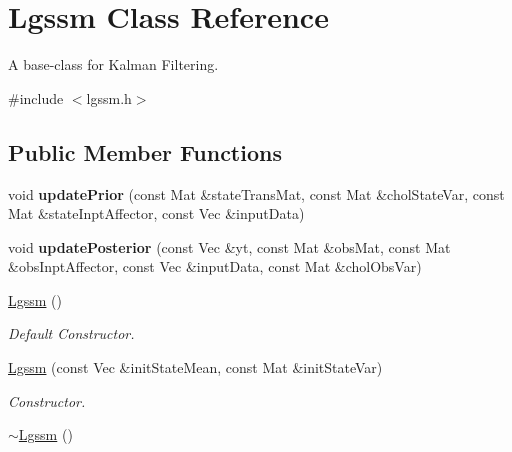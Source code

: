 \hypertarget{classLgssm}{}\section{Lgssm Class Reference}
\label{classLgssm}


A base-\/class for Kalman Filtering.  




{\ttfamily \#include $<$lgssm.\+h$>$}

\subsection*{Public Member Functions}
\begin{DoxyCompactItemize}
\item 
void {\bfseries update\+Prior} (const Mat \&state\+Trans\+Mat, const Mat \&chol\+State\+Var, const Mat \&state\+Inpt\+Affector, const Vec \&input\+Data)\hypertarget{classLgssm_ab6df7f45d20a18f1f6b330ae30507f4d}{}\label{classLgssm_ab6df7f45d20a18f1f6b330ae30507f4d}

\item 
void {\bfseries update\+Posterior} (const Vec \&yt, const Mat \&obs\+Mat, const Mat \&obs\+Inpt\+Affector, const Vec \&input\+Data, const Mat \&chol\+Obs\+Var)\hypertarget{classLgssm_a83bccb6907e9d672c6a7d634e9e569f2}{}\label{classLgssm_a83bccb6907e9d672c6a7d634e9e569f2}

\item 
\hyperlink{classLgssm_a8c729ab27738f29225847777b740877e}{Lgssm} ()\hypertarget{classLgssm_a8c729ab27738f29225847777b740877e}{}\label{classLgssm_a8c729ab27738f29225847777b740877e}

\begin{DoxyCompactList}\small\item\em Default Constructor. \end{DoxyCompactList}\item 
\hyperlink{classLgssm_a779def860490023f436b4efe071789fd}{Lgssm} (const Vec \&init\+State\+Mean, const Mat \&init\+State\+Var)
\begin{DoxyCompactList}\small\item\em Constructor. \end{DoxyCompactList}\item 
\hyperlink{classLgssm_afdb5db740e12453879d8b985180426a4}{$\sim$\+Lgssm} ()\hypertarget{classLgssm_afdb5db740e12453879d8b985180426a4}{}\label{classLgssm_afdb5db740e12453879d8b985180426a4}


\end{DoxyCompactItemize}
